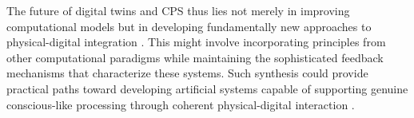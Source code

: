 The future of digital twins and CPS thus lies not merely in improving computational models but in developing fundamentally new approaches to physical-digital integration \cite{Wang2019}. This might involve incorporating principles from other computational paradigms while maintaining the sophisticated feedback mechanisms that characterize these systems. Such synthesis could provide practical paths toward developing artificial systems capable of supporting genuine conscious-like processing through coherent physical-digital interaction \cite{White2021}.